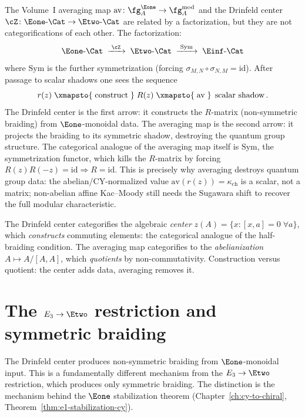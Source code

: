 \begin{remark}
\label{rem:center-not-averaging}
The Volume~I averaging map
$\mathrm{av} \colon \fg^{\Eone}_A \to \fg^{\mathrm{mod}}_A$
and the Drinfeld center
$\cZ \colon \Eone\text{-}\Cat \to \Etwo\text{-}\Cat$
are related by a factorization, but they are not
categorifications of each other. The factorization:
\[
 \Eone\text{-}\Cat
 \;\xrightarrow{\;\cZ\;}\;
 \Etwo\text{-}\Cat
 \;\xrightarrow{\;\mathrm{Sym}\;}\;
 \Einf\text{-}\Cat
\]
where $\mathrm{Sym}$ is the further symmetrization
(forcing $\sigma_{M,N} \circ \sigma_{N,M} = \mathrm{id}$).
After passage to scalar shadows one sees the sequence
\[
 r(z) \;\xmapsto{\;\text{construct}\;}\; R(z)
 \;\xmapsto{\;\mathrm{av}\;}\;
 \operatorname{scalar\ shadow}.
\]
The Drinfeld center is the first arrow:
it constructs the $R$-matrix (non-symmetric braiding) from
$\Eone$-monoidal data. The averaging map is the
second arrow: it projects the braiding to its
symmetric shadow, destroying the quantum group structure.
The categorical analogue of the averaging map itself is
$\mathrm{Sym}$, the symmetrization functor, which kills
the $R$-matrix by forcing
$R(z) R(-z) = \mathrm{id} \Rightarrow R = \mathrm{id}$.
This is precisely why averaging destroys quantum group data:
the abelian/CY-normalized value $\mathrm{av}(r(z)) = \kappa_{\mathrm{ch}}$
is a scalar, not a matrix; non-abelian affine Kac--Moody still needs
the Sugawara shift to recover the full modular characteristic.

The Drinfeld center categorifies the algebraic
\emph{center} $z(A) = \{x : [x,a] = 0\;\forall a\}$, which
\emph{constructs} commuting elements: the categorical
analogue of the half-braiding condition. The averaging map
categorifies to the \emph{abelianization}
$A \mapsto A/[A,A]$, which \emph{quotients} by
non-commutativity. Construction versus quotient: the center
adds data, averaging removes it.
\end{remark}

\section{The \texorpdfstring{$E_3 \to \Etwo$}{E-3 -> E2} restriction and symmetric braiding}
\label{sec:e3-symmetric}

The Drinfeld center produces non-symmetric braiding from
$\Eone$-monoidal input. This is a fundamentally different
mechanism from the $E_3 \to \Etwo$ restriction, which
produces only symmetric braiding. The distinction is the
mechanism behind the $\Eone$ stabilization theorem
(Chapter~\ref{ch:cy-to-chiral},
Theorem~\ref{thm:e1-stabilization-cy}).

